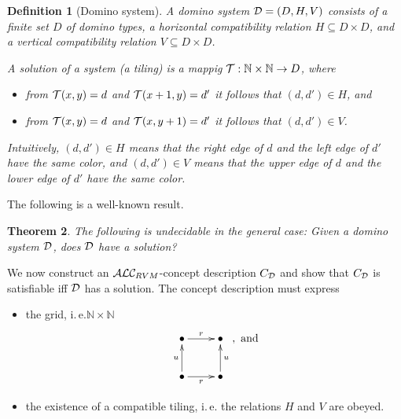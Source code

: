 \documentclass[openany]{scrbook}
\theoremstyle{break}
\newtheorem{Theorem}{Theorem}[chapter]
\newtheorem{Definition}[Theorem]{Definition}
\theoremstyle{nonumberbreak}
\theoremstyle{nonumberplain}
\theoremstyle{nonumberbreak}
\newcommand{\N}{\mathbb{N}}
\newcommand{\ie}{i{.}\,e{.}\xspace}
\newcommand{\ALCrvm}{{\cal A}{\cal L}{\cal C}_{RVM}}
\begin{document}
\begin{Definition}[Domino system]
  \label{7.1}
  A domino system ${\cal D} = (D, H, V)$ consists of a finite set $D$
  of domino types, a horizontal compatibility relation $H \subseteq D
  \times D$, and a vertical compatibility relation $V \subseteq D
  \times D$.

  A solution of a system (a tiling) is a mappig ${\cal T}: \N \times
  \N \to D$, where
  \begin{itemize}
  \item from ${\cal T}(x, y) = d$ and ${\cal T}(x + 1, y) = d'$ it
    follows that $(d, d') \in H$, and
  \item from ${\cal T}(x, y) = d$ and ${\cal T}(x, y + 1) = d'$ it
    follows that $(d, d') \in V$.
  \end{itemize}

  Intuitively, $(d, d') \in H$ means that the right edge of $d$ and
  the left edge of $d'$ have the same color, and $(d, d') \in V$ means
  that the upper edge of $d$ and the lower edge of $d'$ have the same
  color.
\end{Definition}

The following is a well-known result.
\begin{Theorem}
  \label{7.2}
  The following is undecidable in the general case:
  Given a domino system ${\cal D}$, does ${\cal D}$ have a solution?
\end{Theorem}

We now construct an $\ALCrvm$-concept description $C_{\cal D}$ and
show that $C_{\cal D}$ is satisfiable iff ${\cal D}$ has a
solution. The concept description must express
\begin{itemize}
\item the grid, \ie $\N \times \N$
  \begin{equation*}
    \xymatrix{\bullet \ar[r]^{r} & \bullet \\ \bullet \ar[u]^{u}
      \ar[r]_{r} & \bullet \ar[u]_{u}},\ \text{and}
  \end{equation*}
\item the existence of a compatible tiling, \ie the relations $H$ and
  $V$ are obeyed.
\end{itemize}
\end{document}
